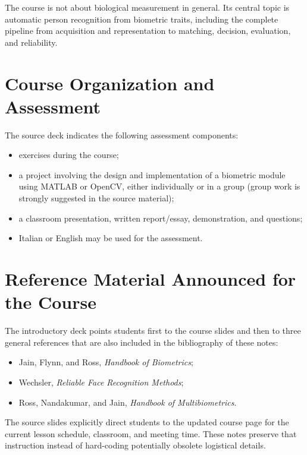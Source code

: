 \documentclass[11pt,a4paper,oneside]{report}
\begin{document}
\begin{keyconcept}
The course is not about biological measurement in general.  Its central topic
is automatic person recognition from biometric traits, including the complete
pipeline from acquisition and representation to matching, decision, evaluation,
and reliability.
\end{keyconcept}

\section*{Course Organization and Assessment}
{}

The source deck indicates the following assessment components:
\begin{itemize}
    \item exercises during the course;
    \item a project involving the design and implementation of a biometric
          module using MATLAB or OpenCV, either individually or in a group
          (group work is strongly suggested in the source material);
    \item a classroom presentation, written report/essay, demonstration, and
          questions;
    \item Italian or English may be used for the assessment.
\end{itemize}

\section*{Reference Material Announced for the Course}
{}

The introductory deck points students first to the course slides and then to
three general references that are also included in the bibliography of these
notes:
\begin{itemize}
    \item Jain, Flynn, and Ross, \emph{Handbook of Biometrics};
    \item Wechsler, \emph{Reliable Face Recognition Methods};
    \item Ross, Nandakumar, and Jain, \emph{Handbook of Multibiometrics}.
\end{itemize}

\begin{remarkbox}
The source slides explicitly direct students to the updated course page for the
current lesson schedule, classroom, and meeting time.  These notes preserve that
instruction instead of hard-coding potentially obsolete logistical details.
\end{remarkbox}
\end{document}
